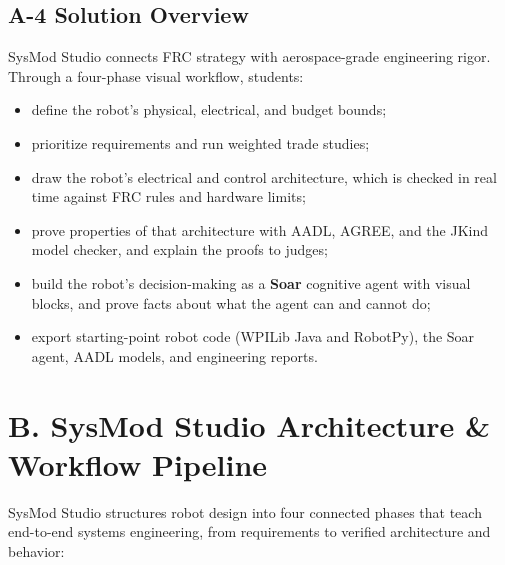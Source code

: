 \documentclass[11pt,letterpaper]{article}
\begin{document}
\subsection*{\normalsize {A-4 Solution Overview}}\label{sec:A4}
SysMod Studio connects FRC strategy with aerospace-grade engineering rigor. Through a four-phase visual workflow, students:

\begin{itemize}
    \item define the robot's physical, electrical, and budget bounds;
    \item prioritize requirements and run weighted trade studies;
    \item draw the robot's electrical and control architecture, which is checked in real time against FRC rules and hardware limits;
    \item prove properties of that architecture with AADL, AGREE, and the JKind model checker, and explain the proofs to judges;
    \item build the robot's decision-making as a \textbf{Soar} cognitive agent with visual blocks, and prove facts about what the agent can and cannot do;
    \item export starting-point robot code (WPILib Java and RobotPy), the Soar agent, AADL models, and engineering reports.
\end{itemize}

\newpage

\section*{\Large {B. SysMod Studio Architecture \& Workflow Pipeline}}\label{sec:B}
SysMod Studio structures robot design into four connected phases that teach end-to-end systems engineering, from requirements to verified architecture and behavior:
\end{document}
